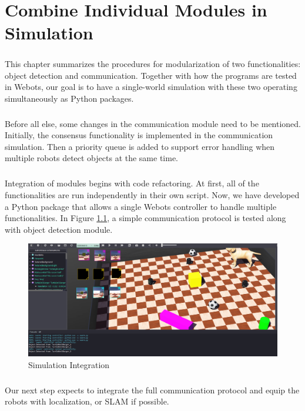 \chapter{Combine Individual Modules in Simulation}

\paragraph*{}
This chapter summarizes the procedures for modularization of two functionalities: object detection and communication. Together with how the programs are tested in Webots, our goal is to have a single-world simulation with these two operating simultaneously as Python packages.

\paragraph*{}
Before all else, some changes in the communication module need to be mentioned. Initially, the consensus functionality is implemented in the communication simulation. Then a priority queue is added to support error handling when multiple robots detect objects at the same time.

\paragraph*{}
Integration of modules begins with code refactoring. At first, all of the functionalities are run independently in their own script. Now, we have developed a Python package that allows a single Webots controller to handle multiple functionalities. In Figure \ref{fig:integration}, a simple communication protocol is tested along with object detection module.

\begin{figure}[H]
    \centering
    \includegraphics[width=0.8\linewidth]{assets/images/integration/swarm-com.png}
    \caption{Simulation Integration}
    \label{fig:integration}
\end{figure}

\paragraph*{}
Our next step expects to integrate the full communication protocol and equip the robots with localization, or SLAM if possible.